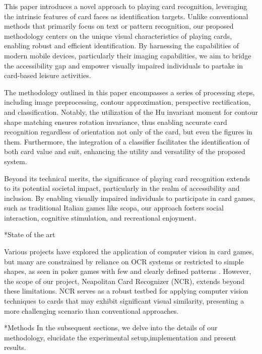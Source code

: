\documentclass[twocolumn, a4paper,10pt]{article}
\makeatletter
\renewcommand\section{\@startsection{section}{1}{\z@}{3pt}{3pt}{\normalfont\large\bfseries}}
\renewcommand\subsection{\@startsection{subsection}{1}{\z@}{\z@}{\z@}{\normalfont\normalsize\bfseries}}
\renewcommand\subsection{\@startsection{subsection}{1}{\z@}{\z@}{0.1pt}{\normalfont\normalsize\bfseries}}
\makeatother
\begin{document}
This paper introduces a novel approach to playing card recognition, leveraging the intrinsic features of card faces as identification targets. Unlike conventional methods that primarily focus on text or pattern recognition, our proposed methodology centers on the unique visual characteristics of playing cards, enabling robust and efficient identification. By harnessing the capabilities of modern mobile devices, particularly their imaging capabilities, we aim to bridge the accessibility gap and empower visually impaired individuals to partake in card-based leisure activities.

The methodology outlined in this paper encompasses a series of processing steps, including image preprocessing, contour approximation, perspective rectification, and classification. Notably, the utilization of the Hu invariant moment for contour shape matching ensures rotation invariance, thus enabling accurate card recognition regardless of orientation not only of the card, but even the figures in them. Furthermore, the integration of a classifier facilitates the identification of both card value and suit, enhancing the utility and versatility of the proposed system.

Beyond its technical merits, the significance of playing card recognition extends to its potential societal impact, particularly in the realm of accessibility and inclusion. By enabling visually impaired individuals to participate in card games, such as traditional Italian games like scopa, our approach fosters social interaction, cognitive stimulation, and recreational enjoyment.

\subsection*{State of the art}

Various projects have explored the application of computer vision in card games, but many are constrained by reliance on OCR systems \cite{7972274} or restricted to simple shapes, as seen in poker games with few and clearly defined patterns \cite{9563607}. However, the scope of our project, Neapolitan Card Recognizer (NCR), extends beyond these limitations. NCR serves as a robust testbed for applying computer vision techniques to cards that may exhibit significant visual similarity, presenting a more challenging scenario than conventional approaches.


\section*{Methods}
In the subsequent sections, we delve into the details of our methodology, elucidate the experimental setup,implementation and present results.
\end{document}
